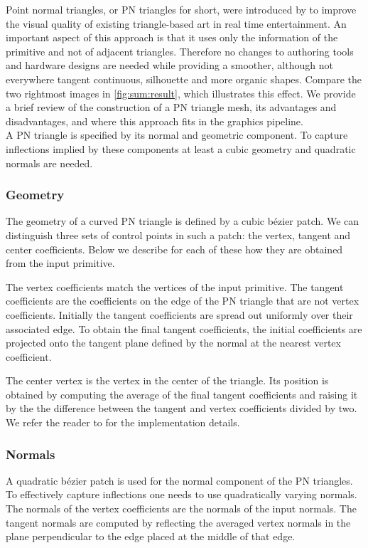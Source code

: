 \noindent Point normal triangles, or PN triangles for short, were introduced by \textcite{vlachos2001curved} to improve the visual quality of existing triangle-based art in real time entertainment. An important aspect of this approach is that it uses only the information of the primitive and not of adjacent triangles. Therefore no changes to authoring tools and hardware designs are needed while providing a smoother, although not everywhere tangent continuous, silhouette and more organic shapes. Compare the two rightmost images in \cref{fig:sum:result}, which illustrates this effect. We provide a brief review of the construction of a PN triangle mesh, its advantages and disadvantages, and where this approach fits in the graphics pipeline.\\

A PN triangle is specified by its normal and geometric component. To capture inflections implied by these components at least a cubic geometry and quadratic normals are needed.

\subsubsection*{Geometry}
The geometry of a curved PN triangle is defined by a cubic b\'ezier patch. We can distinguish three sets of control points in such a patch: the vertex, tangent and center coefficients. Below we describe for each of these how they are obtained from the input primitive. 

The vertex coefficients match the vertices of the input primitive. The tangent coefficients are the coefficients on the edge of the PN triangle that are not vertex coefficients. Initially the tangent coefficients are spread out uniformly over their associated edge. To obtain the final tangent coefficients, the initial coefficients are projected onto the tangent plane defined by the normal at the nearest vertex coefficient. 

The center vertex is the vertex in the center of the triangle. Its position is obtained by computing the average of the final tangent coefficients and raising it by the the difference between the tangent and vertex coefficients divided by two. We refer the reader to \textcite{vlachos2001curved} for the implementation details.

\subsubsection*{Normals}
A quadratic b\'ezier patch is used for the normal component of the PN triangles. To effectively capture inflections one needs to use quadratically varying normals. The normals of the vertex coefficients are the normals of the input normals. The tangent normals are computed by reflecting the averaged vertex normals in the plane perpendicular to the edge placed at the middle of that edge. 


